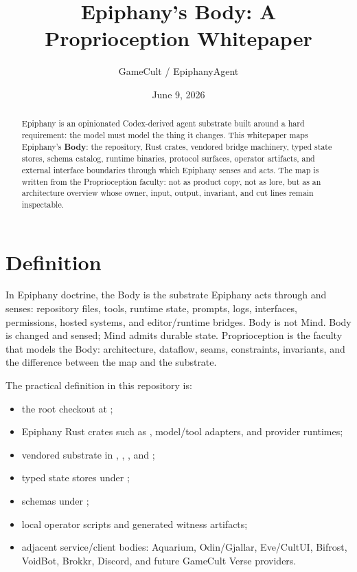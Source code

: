 \documentclass[11pt]{article}
\title{Epiphany's Body: A Proprioception Whitepaper}
\author{GameCult / EpiphanyAgent}
\date{June 9, 2026}
\newcommand{\bodyterm}[1]{\textbf{#1}}
\begin{document}
\maketitle

\begin{abstract}
Epiphany is an opinionated Codex-derived agent substrate built around a hard
requirement: the model must model the thing it changes. This whitepaper maps
Epiphany's \bodyterm{Body}: the repository, Rust crates, vendored bridge
machinery, typed state stores, schema catalog, runtime binaries, protocol
surfaces, operator artifacts, and external interface boundaries through which
Epiphany senses and acts. The map is written from the Proprioception faculty:
not as product copy, not as lore, but as an architecture overview whose owner,
input, output, invariant, and cut lines remain inspectable.
\end{abstract}

\section{Definition}

In Epiphany doctrine, the Body is the substrate Epiphany acts through and
senses: repository files, tools, runtime state, prompts, logs, interfaces,
permissions, hosted systems, and editor/runtime bridges. Body is not Mind. Body
is changed and sensed; Mind admits durable state. Proprioception is the faculty
that models the Body: architecture, dataflow, seams, constraints, invariants,
and the difference between the map and the substrate.

The practical definition in this repository is:

\begin{itemize}
  \item the root checkout at ;
  \item Epiphany Rust crates such as , model/tool adapters, and provider runtimes;
  \item vendored substrate in , , , and ;
  \item typed state stores under ;
  \item schemas under ;
  \item local operator scripts and generated witness artifacts;
  \item adjacent service/client bodies: Aquarium, Odin/Gjallar, Eve/CultUI,
    Bifrost, VoidBot, Brokkr, Discord, and future GameCult Verse providers.
\end{itemize}
\end{document}
